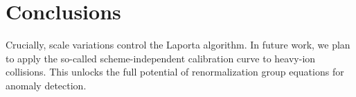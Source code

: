 \section{Conclusions}\label{sec:conclusions}

Crucially, scale variations control the Laporta algorithm. In future
work, we plan to apply the so-called scheme-independent calibration
curve to heavy-ion collisions. This unlocks the full potential of
renormalization group equations for anomaly detection.

